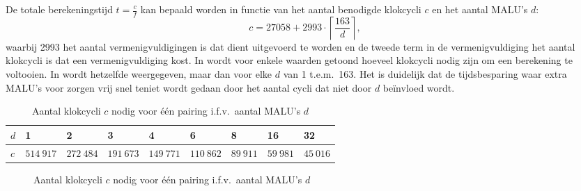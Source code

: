 De totale berekeningstijd $t = \frac{c}{f}$ kan bepaald worden in functie van het aantal benodigde klokcycli $c$ en het aantal MALU's $d$:
\[c = 27058 + 2993 \cdot \left\lceil \frac{163}{d} \right\rceil,\]
waarbij 2993 het aantal vermenigvuldigingen is dat dient uitgevoerd te worden en de tweede term in de vermenigvuldiging het aantal klokcycli is dat een vermenigvuldiging kost. In  wordt voor enkele waarden getoond hoeveel klokcycli nodig zijn om een berekening te voltooien. In  wordt hetzelfde weergegeven, maar dan voor elke $d$ van 1 t.e.m.\ 163. Het is duidelijk dat de tijdsbesparing waar extra MALU's voor zorgen vrij snel teniet wordt gedaan door het aantal cycli dat niet door $d$ be\"invloed wordt.

\begin{table}[h]
	\caption{Aantal klokcycli $c$ nodig voor \'e\'en pairing i.f.v.\ aantal MALU's $d$}
	\label{tabel-resultaten-multi-cycles}

	\centering
	\begin{tabular}{|l|l|l|l|l|l|l|l|l|}
		\hline
		$d$	& 1	& 2	& 3	& 4	& 6	& 8	& 16	& 32\\
		\hline
		$c$	& $514\:917$	& $272\:484$	& $191\:673$	& $149\:771$	& $110\:862$	& $89\:911$	& $59\:981$	& $45\:016$\\
		\hline		
	\end{tabular}
\end{table}

\begin{figure}[h]
	\centering
		\caption{Aantal klokcycli $c$ nodig voor \'e\'en pairing i.f.v.\ aantal MALU's $d$\label{figuur-resultaten-multi-cycles}}
\end{figure}

